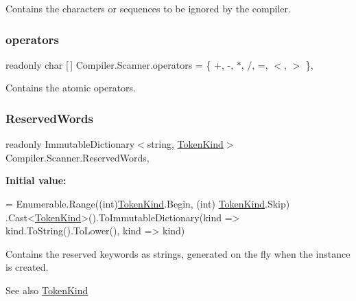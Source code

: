 Contains the characters or sequences to be ignored by the compiler. \mbox{\label{class_compiler_1_1_scanner_a06b412dc474f3c625169dea913ee95da}} 
\subsubsection{\texorpdfstring{operators}{operators}}
{\footnotesize\ttfamily readonly char \mbox{[}$\,$\mbox{]} Compiler.\+Scanner.\+operators = \{ \textquotesingle{}+\textquotesingle{}, \textquotesingle{}-\/\textquotesingle{}, \textquotesingle{}$\ast$\textquotesingle{}, \textquotesingle{}/\textquotesingle{}, \textquotesingle{}=\textquotesingle{}, \textquotesingle{}$<$\textquotesingle{}, \textquotesingle{}$>$\textquotesingle{} \}\hspace{0.3cm}{\ttfamily [static]}, {\ttfamily [private]}}

Contains the atomic operators. \mbox{\label{class_compiler_1_1_scanner_af08999456293c083a301561a5f96ca8b}} 
\subsubsection{\texorpdfstring{Reserved\+Words}{ReservedWords}}
{\footnotesize\ttfamily readonly Immutable\+Dictionary$<$string, \mbox{\hyperlink{namespace_compiler_a57929962f25004759596fc3f13cf563c}{Token\+Kind}}$>$ Compiler.\+Scanner.\+Reserved\+Words\hspace{0.3cm}{\ttfamily [static]}, {\ttfamily [private]}}

{\bfseries Initial value\+:}
\begin{DoxyCode}
=
                    Enumerable.Range((\textcolor{keywordtype}{int})\mbox{\hyperlink{namespace_compiler_a57929962f25004759596fc3f13cf563c}{TokenKind}}.Begin, (\textcolor{keywordtype}{int})
      \mbox{\hyperlink{namespace_compiler_a57929962f25004759596fc3f13cf563c}{TokenKind}}.Skip)
                    .Cast<\mbox{\hyperlink{namespace_compiler_a57929962f25004759596fc3f13cf563c}{TokenKind}}>().ToImmutableDictionary(kind => kind.ToString().ToLower(), 
      kind => kind)
\end{DoxyCode}
Contains the reserved keywords as strings, generated on the fly when the instance is created. \begin{DoxySeeAlso}{See also}
\mbox{\hyperlink{namespace_compiler_a57929962f25004759596fc3f13cf563c}{Token\+Kind}} 
\end{DoxySeeAlso}
\mbox{\label{class_compiler_1_1_scanner_a6fa17eef62c3cf43853464ccfbd61966}} 
